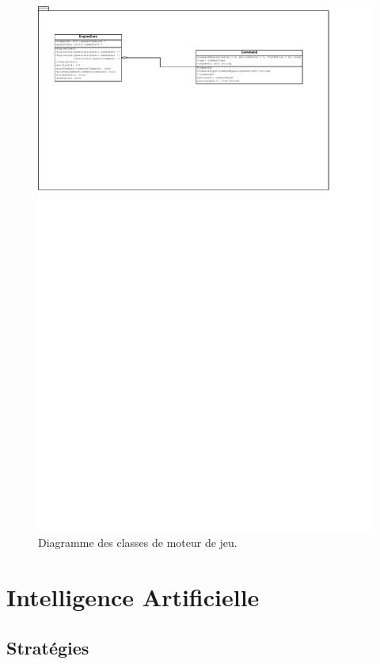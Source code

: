 \documentclass[a4paper,12pt]{article}
\begin{document}
\begin{landscape}
\begin{figure}[p]
\includegraphics[width=0.9\paperheight]{engine.pdf}
\caption{\label{uml:engine}Diagramme des classes de moteur de jeu.} 
\end{figure}
\end{landscape}


\section{Intelligence Artificielle}

\subsection{Stratégies}
\end{document}
